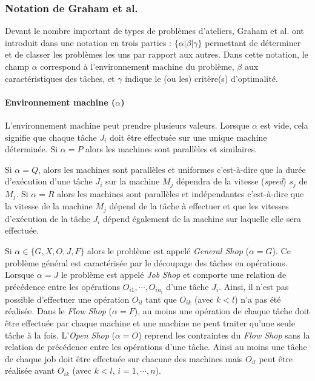 \subsubsection{Notation de Graham et al.} \label{chap:art:sec:jssp:subsec:def:graham}
Devant le nombre important de types de problèmes d'ateliers, Graham et al. ont introduit dans \cite{Graham1979} une notation en trois parties : $\{\alpha | \beta | \gamma \}$ permettant de déterminer et de classer les problèmes les uns par rapport aux autres. Dans cette notation, le champ $\alpha$ correspond à l'environnement machine du problème, $\beta$ aux caractéristiques des tâches, et $\gamma$ indique le (ou les) critère(s) d'optimalité.

\paragraph{Environnement machine ($\alpha$)}

L'environnement machine peut prendre plusieurs valeurs. Lorsque $\alpha$ est vide, cela signifie que chaque tâche $J_i$ doit être effectuée sur une unique machine déterminée. Si $\alpha=P$ alors les machines sont parallèles et similaires.

Si $\alpha=Q$, alors les machines sont parallèles et uniformes c'est-à-dire que la durée d'exécution d'une tâche $J_i$ sur la machine $M_j$ dépendra de la vitesse (\textit{speed}) $s_j$ de $M_j$. Si $\alpha=R$ alors les machines sont parallèles et indépendantes c'est-à-dire que la vitesse de la machine $M_j$ dépend de la tâche à effectuer et que les vitesses d'exécution de la tâche $J_i$ dépend également de la machine sur laquelle elle sera effectuée.

Si $\alpha \in \{G, X, O, J, F\}$  alors le problème est appelé \textit{General Shop} ($\alpha=G$). Ce problème général est caractérisée par le découpage des tâches en opérations. Lorsque $\alpha=J$ le problème est appelé \textit{Job Shop} et comporte une relation de précédence entre les opérations $O_{i1},\cdots,O_{in_i}$ d'une tâche $J_i$. Ainsi, il n'est pas possible d'effectuer une opération $O_{il}$ tant que $O_{ik}$ (avec $k<l$) n'a pas été réalisée. Dans le \textit{Flow Shop} ($\alpha=F$), au moins une opération de chaque tâche doit être effectuée par chaque machine et une machine ne peut traiter qu'une seule tâche à la fois. L'\textit{Open Shop} ($\alpha=O$) reprend les contraintes du \textit{Flow Shop} sans la relation de précédence entre les opérations d'une tâche. Ainsi au moins une tâche de chaque job doit être effectuée sur chacune des machines mais $O_{il}$ peut être réalisée avant $O_{ik}$ (avec $k<l$, $i=1,\cdots,n$).

